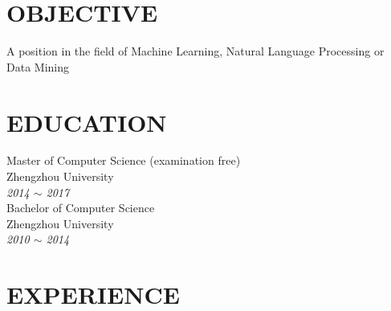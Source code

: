 \documentclass[line, margin]{res}
\begin{document}
\address{likun@stu.zzu.edu.cn}
\address{152-2511-1797}

\begin{resume}
\vspace {5pt}
\section{OBJECTIVE}
A position in the field of Machine Learning, Natural Language Processing or Data Mining

\section{EDUCATION} 
 { Master of Computer Science (examination free)  \\
 Zhengzhou University }\\
 {\sl 2014 $\sim$ 2017} \\
[15pt]
 { Bachelor of Computer Science \\
 Zhengzhou University } \\
 {\sl 2010 $\sim$ 2014 }
 
\section{EXPERIENCE}


\end{resume}
\end{document}
